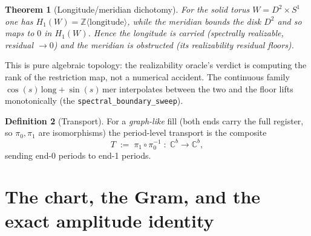 \documentclass[11pt]{article}
\newcommand{\C}{\mathbb{C}}
\newcommand{\Z}{\mathbb{Z}}
\newcommand{\code}[1]{\texttt{#1}}
\theoremstyle{plain}
\newtheorem{theorem}{Theorem}[section]
\theoremstyle{definition}
\newtheorem{definition}[theorem]{Definition}
\begin{document}
\begin{theorem}[Longitude/meridian dichotomy]
\label{thm:dichotomy}
For the solid torus $W=D^2\times S^1$ one has $H_1(W)=\Z\langle\text{longitude}\rangle$, while
the meridian bounds the disk $D^2$ and so maps to $0$ in $H_1(W)$. Hence the longitude is
carried (spectrally realizable, residual $\to 0$) and the meridian is obstructed (its
realizability residual floors).
\end{theorem}

This is pure algebraic topology: the realizability oracle's verdict is computing the rank of
the restriction map, not a numerical accident. The continuous family
$\cos(s)\,\text{long}+\sin(s)\,\text{mer}$ interpolates between the two and the floor lifts
monotonically (the \code{spectral\_boundary\_sweep}).

\begin{definition}[Transport]
\label{def:transport}
For a \emph{graph-like} fill (both ends carry the full register, so $\pi_0,\pi_1$ are
isomorphisms) the period-level transport is the composite
\begin{equation}
  T \;:=\; \pi_1\circ\pi_0^{-1} \;:\; \C^b\to\C^b,
\end{equation}
sending end-0 periods to end-1 periods.
\end{definition}

\begin{center}
\end{center}

\section{The chart, the Gram, and the exact amplitude identity}
\label{sec:amplitude}
\end{document}
